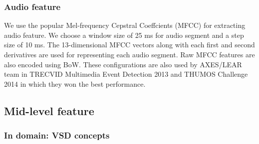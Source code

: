 \documentclass[review]{elsarticle}
\begin{document}
\subsubsection{Audio feature}
We use the popular Mel-frequency Cepstral Coeffcients (MFCC) \cite{rabiner2007introduction} for extracting audio feature. We choose a window size of 25 ms for audio segment and a step size of 10 ms. The 13-dimensional MFCC vectors along with each first and second derivatives are used for representing each audio segment. Raw MFCC features are also encoded using BoW. These configurations are also used by AXES/LEAR team in TRECVID Multimedia Event Detection 2013 \cite{aly2013axes} and THUMOS Challenge 2014 \cite{oneata2014lear} in which they won the best performance.

\subsection{Mid-level feature}
\subsubsection{In domain: VSD concepts}
\end{document}
